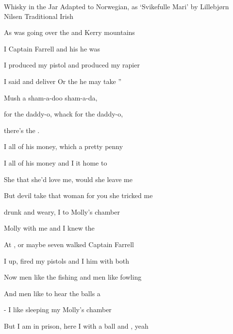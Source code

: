 \begin{SBSong}{Whisky in the Jar}
  {Adapted to Norwegian, as `Svikefulle Mari' by Lillebj\o rn Nilsen}
  {Traditional Irish}
  \begin{SBVerse}
    As  was going over the  and Kerry mountains

    I  Captain Farrell and his  he was 

    I  produced my pistol and  produced my rapier

    I said  and deliver Or the  he may take ''
  \end{SBVerse}
  \begin{SBChorus}
    Mush a  sham-a-doo sham-a-da,

     for the daddy-o, whack for the daddy-o,

    there's   the .
  \end{SBChorus}
  \begin{SBVerse}
    I  all of his money, which  a pretty penny

    I  all of his money and I  it home to 

    She  that she'd love me,  would she leave me

    But  devil take that woman for you  she tricked me 
  \end{SBVerse}
  \begin{SBVerse}
     drunk and weary, I  to Molly's chamber

     Molly with me and I  knew the 

    At , or maybe seven  walked Captain Farrell

    I  up, fired my pistols and I  him with both 
  \end{SBVerse}
  \begin{SBVerse}
    Now  men like the fishing and  men like fowling

    And  men like to hear the balls a 

     - I like sleeping  my Molly's chamber

    But  I am in prison, here I  with a ball and , yeah
  \end{SBVerse}
\end{SBSong}
